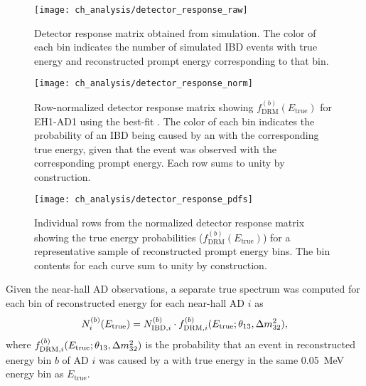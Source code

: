 \begin{figure}
    \centering
    \texttt{[image: ch\_analysis/detector\_response\_raw]}
    \caption[Detector response matrix]{
        Detector response matrix obtained from simulation.
        The color of each bin indicates the number of simulated IBD events
        with true \nuebar{} energy and reconstructed prompt energy
        corresponding to that bin.
    }
    \label{fig:drm}
\end{figure}

\begin{figure}
    \centering
    \texttt{[image: ch\_analysis/detector\_response\_norm]}
    \caption[Detector response matrix, row-normalized]{
        Row-normalized detector response matrix
        showing $f^{(b)}_\text{DRM}(E_\text{true})$
        for EH1-AD1 using the best-fit \thetaot{}.
        The color of each bin indicates the probability
        of an IBD being caused by an \nuebar{} with the corresponding true energy,
        given that the event was observed with the corresponding prompt energy.
        Each row sums to unity by construction.
    }
    \label{fig:drm_norm}
\end{figure}

\begin{figure}
    \centering
    \texttt{[image: ch\_analysis/detector\_response\_pdfs]}
    \caption[Individual rows of normalized detector response matrix]{
        Individual rows from the normalized detector response matrix
        showing the true \nuebar{} energy probabilities
        ($f^{(b)}_\text{DRM}(E_\text{true})$)
        for a representative sample of reconstructed prompt energy bins.
        The bin contents for each curve sum to unity by construction.
    }
    \label{fig:drm_pdfs}
\end{figure}

Given the near-hall AD observations,
a separate true \nuebar{} spectrum was computed
for each bin of reconstructed energy for each near-hall AD $i$ as
\begin{equation}\label{eq:drm}
    N_i^{(b)}(E_{\text{true}}) = N_{\text{IBD},i}^{(b)}
    \cdot f_{\text{DRM},i}^{(b)}(E_{\text{true}}; \theta_{13}, \Delta m^2_{32}),
\end{equation}
where $f_{\text{DRM},i}^{(b)}(E_{\text{true}}; \theta_{13}, \Delta m^2_{32})$ is the probability
that an event in reconstructed energy bin $b$
of AD $i$
was caused by a \nuebar{} with true energy in the same \SI{0.05}{\MeV}
energy bin as $E_{\text{true}}$.

